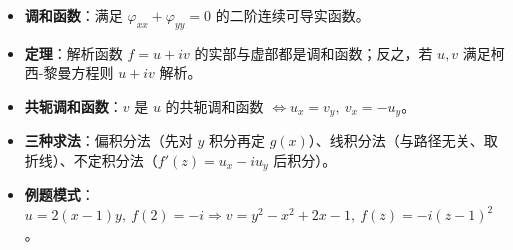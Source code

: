 \begin{itemize}
\tightlist
\item
  \textbf{调和函数}：满足 \(\varphi_{xx}+\varphi_{yy}=0\)
  的二阶连续可导实函数。
\item
  \textbf{定理}：解析函数 \(f=u+iv\) 的实部与虚部都是调和函数；反之，若
  \(u,v\) 满足柯西-黎曼方程则 \(u+iv\) 解析。
\item
  \textbf{共轭调和函数}：\(v\) 是 \(u\) 的共轭调和函数
  \(\iff u_x=v_y,\ v_x=-u_y\)。
\item
  \textbf{三种求法}：偏积分法（先对 \(y\) 积分再定
  \(g(x)\)）、线积分法（与路径无关、取折线）、不定积分法（\(f'(z)=u_x-iu_y\)
  后积分）。
\item
  \textbf{例题模式}：\(u=2(x-1)y,\ f(2)=-i\Rightarrow v=y^2-x^2+2x-1,\ f(z)=-i(z-1)^2\)。
\end{itemize}

\newpage
